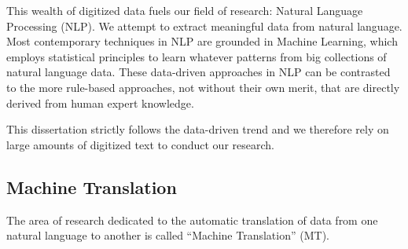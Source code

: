 This wealth of digitized data fuels our field of research: Natural Language
Processing (NLP). We attempt to extract meaningful data from natural language.
Most contemporary techniques in NLP are grounded in Machine Learning, which
employs statistical principles to learn whatever patterns from big collections
of natural language data. These data-driven approaches in NLP can be contrasted to
the more rule-based approaches, not without their own merit, that are directly
derived from human expert knowledge.

This dissertation strictly follows the data-driven trend and we therefore rely
on large amounts of digitized text to conduct our research.

\subsection{Machine Translation}

The area of research dedicated to the automatic translation of data from one
natural language to another is called ``Machine Translation'' (MT).  





















